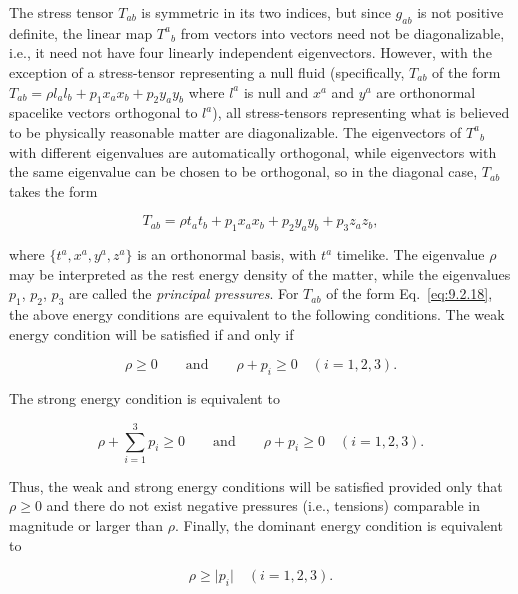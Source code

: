 The stress tensor \(T_{ab}\) is symmetric in its two indices, but since \(g_{ab}\) is not
positive definite, the linear map \(T^a{}_b\) from vectors into vectors need not be
diagonalizable, i.e., it need not have four linearly independent eigenvectors. However,
with the exception of a stress-tensor representing a null fluid (specifically, \(T_{ab}\)
of the form \(T_{ab}=\rho l_al_b+p_1x_ax_b+p_2y_ay_b\) where \(l^a\) is null and \(x^a\)
and \(y^a\) are orthonormal spacelike vectors orthogonal to \(l^a\)), all stress-tensors
representing what is believed to be physically reasonable matter are diagonalizable.
The eigenvectors of \(T^a{}_b\) with different eigenvalues are automatically
orthogonal, while eigenvectors with the same eigenvalue can be chosen to be
orthogonal, so in the diagonal case, \(T_{ab}\) takes the form

\begin{equation}
  T_{ab}=\rho t_at_b+p_1x_ax_b+p_2y_ay_b+p_3z_az_b ,
  \tag{9.2.18}\label{eq:9.2.18}
\end{equation}

where \(\{t^a,x^a,y^a,z^a\}\) is an orthonormal basis, with \(t^a\) timelike. The
eigenvalue \(\rho\) may be interpreted as the rest energy density of the matter, while
the eigenvalues \(p_1\), \(p_2\), \(p_3\) are called the \emph{principal pressures}. For
\(T_{ab}\) of the form Eq.~\eqref{eq:9.2.18}, the above energy conditions are equivalent
to the following conditions. The weak energy condition will be satisfied if and only if

\begin{equation}
  \rho\geq0
  \qquad\text{and}\qquad
  \rho+p_i\geq0
  \quad (i=1,2,3) .
  \tag{9.2.19}\label{eq:9.2.19}
\end{equation}

The strong energy condition is equivalent to

\begin{equation}
  \rho+\sum_{i=1}^3p_i\geq0
  \qquad\text{and}\qquad
  \rho+p_i\geq0
  \quad (i=1,2,3) .
  \tag{9.2.20}\label{eq:9.2.20}
\end{equation}

Thus, the weak and strong energy conditions will be satisfied provided only that
\(\rho\geq0\) and there do not exist negative pressures (i.e., tensions) comparable in
magnitude or larger than \(\rho\). Finally, the dominant energy condition is equivalent to

\begin{equation}
  \rho\geq\lvert p_i\rvert
  \quad (i=1,2,3) .
  \tag{9.2.21}\label{eq:9.2.21}
\end{equation}

